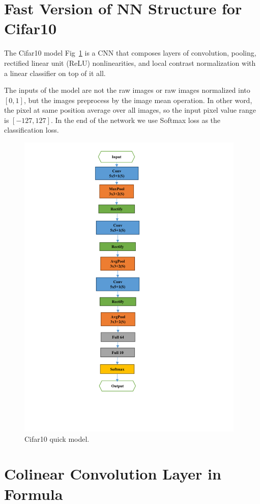 \documentclass[12pt]{article}
\begin{document}
\section{Fast Version of NN Structure for Cifar10}
The Cifar10 model Fig~\ref{fig:quick_model} is a CNN that composes layers of convolution, pooling, rectified linear unit (ReLU) nonlinearities, and local contrast normalization with a linear classifier on top of it all.

The inputs of the model are not the raw images or raw images normalized into $[0,1]$, but the images preprocess by the image mean operation. In other word, the pixel at same position average over all images, so the input pixel value range is $[-127,127]$. In the end of the network we use Softmax loss as the classification loss.

\begin{figure}[!ht]
    \centering
    \includegraphics[height=15cm]{3.pdf}
    \caption{\label{fig:quick_model} Cifar10 quick model. }
\end{figure}

\section{Colinear Convolution Layer in Formula}
\end{document}
